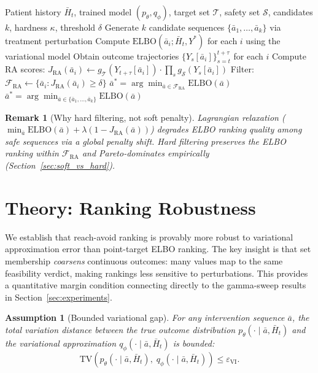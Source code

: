 \documentclass{article}
\newtheorem{remark}{Remark}
\newtheorem{assumption}{Assumption}
\newcommand{\TV}{\mathrm{TV}}
\newcommand{\bH}{\bar{H}}
\newcommand{\ba}{\bar{a}}
\newcommand{\cT}{\mathcal{T}}
\newcommand{\cS}{\mathcal{S}}
\newcommand{\cF}{\mathcal{F}}
\begin{document}
\begin{algorithm}[t]
\caption{Reach-Avoid Constrained Selection}
\label{alg:ra_selection}
\begin{algorithmic}[1]
\REQUIRE Patient history $\bH_t$, trained model $(p_\theta, q_\phi)$, target set $\cT$, safety set $\cS$, candidates $k$, hardness $\kappa$, threshold $\delta$
\STATE Generate $k$ candidate sequences $\{\ba_1, \ldots, \ba_k\}$ via treatment perturbation
\STATE Compute $\mathrm{ELBO}(\ba_i; \bH_t, Y^*)$ for each $i$ using the variational model
\STATE Obtain outcome trajectories $\{Y_s[\ba_i]\}_{s=t}^{t+\tau}$ for each $i$ 
\STATE Compute RA scores: $J_{\mathrm{RA}}(\ba_i) \gets g_\cT(Y_{t+\tau}[\ba_i]) \cdot \prod_s g_\cS(Y_s[\ba_i])$
\STATE Filter: $\cF_{\mathrm{RA}} \gets \{\ba_i : J_{\mathrm{RA}}(\ba_i) \geq \delta\}$
\IF{$\cF_{\mathrm{RA}} \neq \emptyset$}
    \RETURN $\ba^* = \arg\min_{\ba \in \cF_{\mathrm{RA}}} \mathrm{ELBO}(\ba)$
\ELSE
    \RETURN $\ba^* = \arg\min_{\ba \in \{\ba_1, \ldots, \ba_k\}} \mathrm{ELBO}(\ba)$ 
\ENDIF
\end{algorithmic}
\end{algorithm}

\begin{remark}[Why hard filtering, not soft penalty]
\label{rem:hard_vs_soft}
Lagrangian relaxation ($\min_{\ba} \mathrm{ELBO}(\ba) + \lambda (1 - J_{\mathrm{RA}}(\ba))$) degrades ELBO ranking quality among safe sequences via a global penalty shift. Hard filtering preserves the ELBO ranking within $\cF_{\mathrm{RA}}$ and Pareto-dominates empirically (Section~\ref{sec:soft_vs_hard}).
\end{remark}


\section{Theory: Ranking Robustness}
\label{sec:theory}

We establish that reach-avoid ranking is provably more robust to variational approximation error than point-target ELBO ranking. The key insight is that set membership \emph{coarsens} continuous outcomes: many values map to the same feasibility verdict, making rankings less sensitive to perturbations. This provides a quantitative margin condition connecting directly to the gamma-sweep results in Section~\ref{sec:experiments}.

\begin{assumption}[Bounded variational gap]
\label{ass:vi_gap}
For any intervention sequence $\ba$, the total variation distance between the true outcome distribution $p_\theta(\cdot \mid \ba, \bH_t)$ and the variational approximation $q_\phi(\cdot \mid \ba, \bH_t)$ is bounded:
\begin{equation}
\TV(p_\theta(\cdot \mid \ba, \bH_t),\; q_\phi(\cdot \mid \ba, \bH_t)) \leq \varepsilon_{\mathrm{VI}}.
\end{equation}
\end{assumption}
\end{document}
